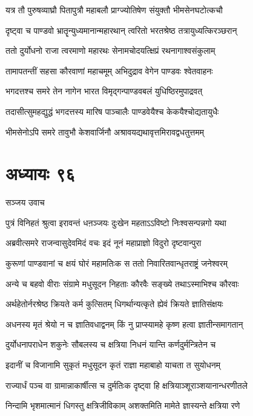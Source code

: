 \twolineshloka
{यत्र तौ पुरुषव्याघ्रौ पितापुत्रौ महाबलौ}
{प्राग्ज्योतिषेण संयुक्तौ भीमसेनघटोत्कचौ}


\twolineshloka
{दृष्ट्वा च पाण्डवो भ्रातॄन्युध्यमानान्महारथान्}
{त्वरितो भरतश्रेष्ठ तत्रायुध्यत्किरञ्छरान्}


\twolineshloka
{ततो दुर्योधनो राजा त्वरमाणो महारथः}
{सेनामचोदयत्क्षिप्रं रथनागाश्वसंकुलाम्}


\twolineshloka
{तामापतन्तीं सहसा कौरवाणां महाचमूम्}
{अभिदुद्राव वेगेन पाण्डवः श्वेतवाहनः}


\twolineshloka
{भगदत्तश्च समरे तेन नागेन भारत}
{विमृद्गन्पाण्डवबलं युधिष्ठिरमुपाद्रवत्}


\twolineshloka
{तदासीत्सुमहद्युद्धं भगदत्तस्य मारिष}
{पाञ्चालैः पाण्डवेयैश्च केकयैश्चोद्यतायुधैः}


\twolineshloka
{भीमसेनोऽपि समरे तावुभौ केशवार्जिनौ}
{अश्रावयद्यथावृत्तमिरावद्वधतुत्तमम्}


\chapter{अध्यायः ९६}
\twolineshloka
{सञ्जय उवाच}
{}


\twolineshloka
{पुत्रं विनिहतं श्रुत्वा इरावन्तं धऩञ्जयः}
{दुःखेन महताऽऽविष्टो निःश्वसन्पन्नगो यथा}


\twolineshloka
{अब्रवीत्समरे राजन्वासुदेवमिदं वचः}
{इदं नूनं महाप्राज्ञो विदुरो दृष्टवान्पुरा}


\twolineshloka
{कुरूणां पाण्डवानां च क्षयं घोरं महामतिःक}
{स ततो निवारितवान्धृतराष्ट्रं जनेश्वरम्}


\twolineshloka
{अन्ये च बहवो वीराः संग्रामे मधुसूदन}
{निहताः कौरवैः सङ्ख्ये तथाऽस्माभिश्च कौरवाः}


\twolineshloka
{अर्थहेतोर्नरश्रेष्ठ क्रियते कर्म कुत्सितम्}
{धिगर्थान्यत्कृते ह्येवं क्रियते ज्ञातिसंक्षयः}


\twolineshloka
{अधनस्य मृतं श्रेयो न च ज्ञातिवधाद्वनम्}
{किं नु प्राप्स्यामहे कृष्ण हत्वा ज्ञातीन्समागतान्}


\twolineshloka
{दुर्योधनापराधेन शकुनेः सौबलस्य च}
{क्षत्रिया निधनं यान्ति कर्णदुर्मन्त्रितेन च}


\twolineshloka
{इदानीं च विजानामि सुकृतं मधुसूदन}
{कृतं राज्ञा महाबाहो याचता त सुयोधनम्}


\twolineshloka
{राज्यार्धं पञ्च वा ग्रामान्नाकार्षीत्स च दुर्मतिःक}
{दृष्ट्वा हि क्षत्रियाञ्शूराञ्शयानान्धरणीतले}


\twolineshloka
{निन्दामि भृशमात्मानं धिगस्तु क्षत्रिजीविकाम्}
{अशक्तमिति मामेते ज्ञास्यन्ते क्षत्रिया रणे}



